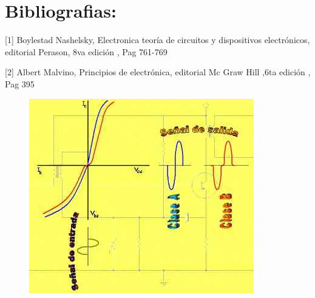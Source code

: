 \documentclass[12pt,a4paper]{article}
\begin{document}
\section{Bibliografias:}
[1] Boylestad Nashelsky, Electronica teoría de circuitos y dispositivos electrónicos, editorial Perason, 8va edición , Pag 761-769

[2] Albert Malvino, Principios de electrónica, editorial Mc Graw Hill ,6ta edición , Pag 395 
\begin{figure}[h!]
\centering
\includegraphics[scale=.5]{generalidades.jpg} 
\end{figure}
\end{document}
